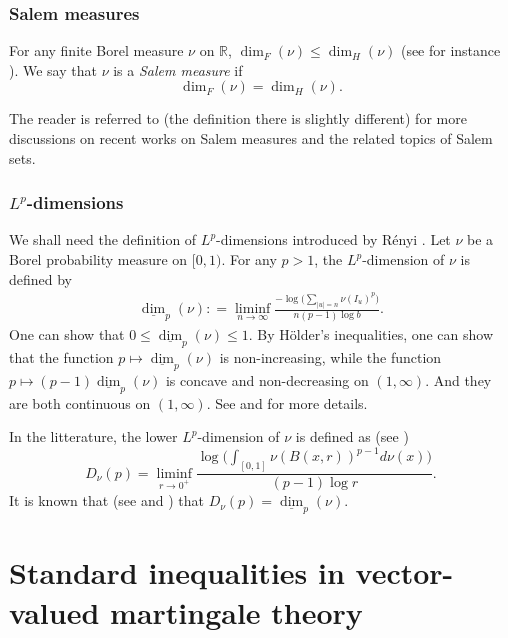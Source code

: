 \documentclass[12pt]{amsart}
\theoremstyle{definition}
\theoremstyle{remark}
\newcommand{\R}{\mathbb{R}}
\numberwithin{equation}{section}
\begin{document}
\subsubsection{Salem measures}\label{sec-salem}

For any finite Borel measure $\nu$ on $\R$,  
$
\dim_F(\nu) \le \dim_H(\nu)$ (see for instance \cite[formula (8.12), p. 231]{BBS}). 
We say that  $\nu$ is a {\it Salem measure} if 
\[
\dim_F(\nu)= \dim_H(\nu). 
\]


The reader is referred to \cite{Laba} (the definition there is slightly different) for more discussions on recent works on  Salem measures and  the related topics of Salem sets. 



\subsubsection{$L^p$-dimensions}\label{sec-def-Dp}
  We shall need the definition of  $L^p$-dimensions introduced by R\'enyi \cite{Renyi}.  Let $\nu$ be a Borel probability measure on $[0,1)$.  For any $p>1$, the  $L^p$-dimension of $\nu$ is defined by
\begin{align}\label{def-D-p}
\underline{\dim}_p(\nu): = \liminf_{n\to\infty} \frac{-\log \big(\sum_{|u|=n}  \nu(I_u)^p\big) }{ n  (p-1)\log b}.
\end{align}
One can show that
$
0\le \underline{\dim}_p(\nu) \le 1. 
$
By H\"older's inequalities, one can show that  the  function  $p\mapsto \underline{\dim}_p(\nu)$ is non-increasing, while the function $p \mapsto (p-1) \underline{\dim}_p(\nu)$ is concave and non-decreasing on $(1, \infty)$.  And  they are both  continuous on $(1, \infty)$. See  \cite[Section 2.6, pp. 70--72]{BBS} and  \cite[p. 261]{Lq-survey}  for more details. 


In the litterature,  the  lower $L^p$-dimension of $\nu$ is defined as (see  \cite[Section 2.6, pp. 70--72]{BBS})
\[
D_\nu(p)=   \liminf_{r\to 0^{+}} \frac{  \log \big(\int_{[0,1]} \nu(B(x,r))^{p-1}  d\nu(x)\big)}{ (p-1)\log r }. 
\]
It is known that (see \cite{Fan-dimension} and \cite[Lemma 2.6.6]{BBS}) that 
$
D_\nu(p) = \underline{\dim}_p(\nu). 
$












\section{Standard inequalities in vector-valued martingale theory}\label{sec-pre-bis}
\end{document}
